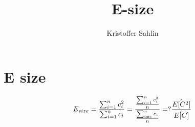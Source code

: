 \documentclass[a4paper,6pt]{article}
\begin{document}
\title{E-size} 
\author{Kristoffer Sahlin}
\date{} %
\maketitle

\section{E size}

 \begin{equation}
 E_{size} = \frac{\sum_{i = 1}^n c_i^2}{ \sum_{i = 1}^n c_i } = \frac{\frac{\sum_{i = 1}^n c_i^2}{n}}{ \frac{\sum_{i = 1}^n c_i}{n} } =? \\
 \frac{\hat{E[C^2]}}{ \hat{E[C]} } 
 \end{equation}
\end{document}
